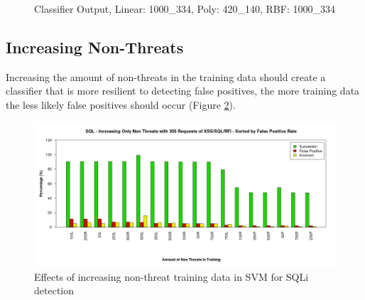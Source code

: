 \begin{figure}[hb]
	\centering
	\caption{Classifier Output, Linear: 1000\_334, Poly: 420\_140, RBF: 1000\_334}
	\label{fig:resClassifiers}
\end{figure}

\newpage
\subsection{Increasing Non-Threats} \label{sec:resNonThreat}

Increasing the amount of non-threats in the training data should create a classifier that is more resilient to detecting false positives, the more training data the less likely false positives should occur (Figure \ref{fig:resFalse}).

\begin{figure}[hb]
	\centering
	\includegraphics[width=450px]{./assets/results/svm/nonthreat/Results_SQL.png}
	\caption{Effects of increasing non-threat training data in SVM for SQLi detection}
	\label{fig:resFalse}
\end{figure}

